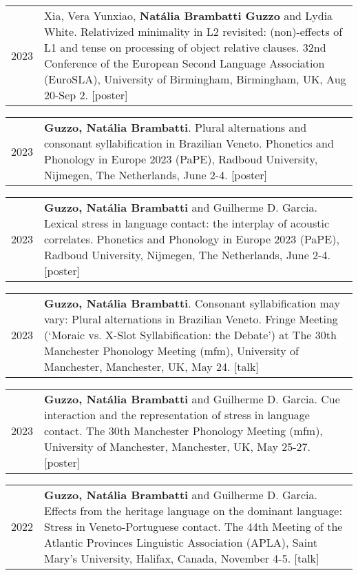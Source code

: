 \documentclass[letterpaper,10pt]{article}
\begin{document}
\begin{tabular}{p{1cm}p{16cm}}
2023 & Xia, Vera Yunxiao, \textbf{Nat\'alia Brambatti Guzzo} and Lydia White. Relativized minimality in L2 revisited: (non)-effects of L1 and tense on processing of object relative clauses. 32nd Conference of the European Second Language Association (EuroSLA), University of Birmingham, Birmingham, UK, Aug 20-Sep 2. [poster]
\end{tabular}

\begin{tabular}{p{1cm}p{16cm}}
2023 & \textbf{Guzzo, Nat\'alia Brambatti}. Plural alternations and consonant syllabification in Brazilian Veneto. Phonetics and Phonology in Europe 2023 (PaPE), Radboud University, Nijmegen, The Netherlands, June 2-4. [poster]
\end{tabular}

\begin{tabular}{p{1cm}p{16cm}}
2023 & \textbf{Guzzo, Nat\'alia Brambatti} and Guilherme D. Garcia. Lexical stress in language contact: the interplay of acoustic correlates. Phonetics and Phonology in Europe 2023 (PaPE), Radboud University, Nijmegen, The Netherlands, June 2-4. [poster]
\end{tabular}


\begin{tabular}{p{1cm}p{16cm}}
2023 & \textbf{Guzzo, Nat\'alia Brambatti}. Consonant syllabification may vary: Plural alternations in Brazilian Veneto. Fringe Meeting (`Moraic vs. X-Slot Syllabification: the Debate') at The 30th Manchester Phonology Meeting (mfm), University of Manchester, Manchester, UK, May 24. [talk]
\end{tabular}

\begin{tabular}{p{1cm}p{16cm}}
2023 & \textbf{Guzzo, Nat\'alia Brambatti} and Guilherme D. Garcia. Cue interaction and the representation of stress in language contact. The 30th Manchester Phonology Meeting (mfm), University of Manchester, Manchester, UK, May 25-27. [poster]
\end{tabular}


\begin{tabular}{p{1cm}p{16cm}}
2022 & \textbf{Guzzo, Nat\'alia Brambatti} and Guilherme D. Garcia. Effects from the heritage language on the dominant language: Stress in Veneto-Portuguese contact. The 44th Meeting of the Atlantic Provinces Linguistic Association (APLA), Saint Mary's University, Halifax, Canada, November 4-5. [talk]
\end{tabular}
\end{document}
